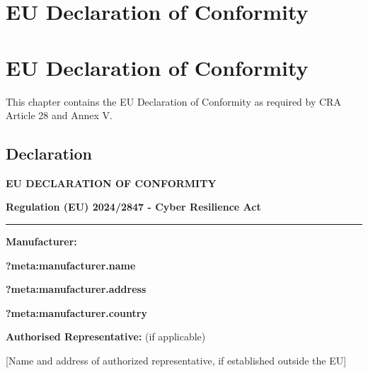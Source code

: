 \documentclass[
  11 pt,
  a4paper,
  table]{report}
\begin{document}

\chapter{EU Declaration of
Conformity}\label{eu-declaration-of-conformity}


\chapter{EU Declaration of
Conformity}\label{eu-declaration-of-conformity-1}

\begin{tcolorbox}[enhanced jigsaw, coltitle=black, bottomrule=.15mm, colback=white, leftrule=.75mm, opacitybacktitle=0.6, rightrule=.15mm, opacityback=0, arc=.35mm, toprule=.15mm, colframe=quarto-callout-important-color-frame, breakable, left=2mm, colbacktitle=quarto-callout-important-color!10!white, titlerule=0mm, bottomtitle=1mm, toptitle=1mm, title=\textcolor{quarto-callout-important-color}{\faExclamation}\hspace{0.5em}{Legal Declaration}]

This chapter contains the EU Declaration of Conformity as required by
CRA Article 28 and Annex V.

\end{tcolorbox}

\section{Declaration}\label{declaration}

\textbf{EU DECLARATION OF CONFORMITY}

\textbf{Regulation (EU) 2024/2847 - Cyber Resilience Act}

\begin{center}\rule{0.5\linewidth}{0.5pt}\end{center}

\textbf{Manufacturer:}

\textbf{?meta:manufacturer.name}

\textbf{?meta:manufacturer.address}

\textbf{?meta:manufacturer.country}

\textbf{Authorised Representative:} (if applicable)

{[}Name and address of authorized representative, if established outside
the EU{]}
\end{document}
